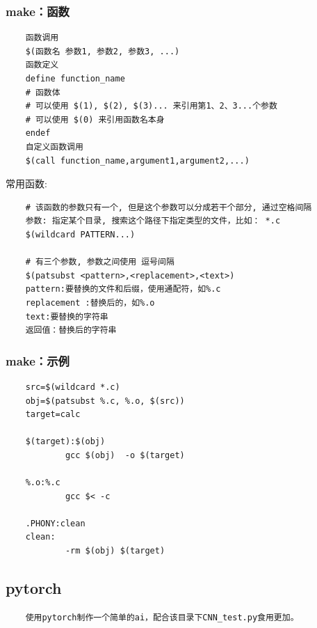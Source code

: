 \documentclass[UTF8]{ctexart}
\begin{document}
\subsubsection{make：函数}
\begin{verbatim}
	函数调用
	$(函数名 参数1, 参数2, 参数3, ...)
	函数定义
	define function_name
	# 函数体
	# 可以使用 $(1), $(2), $(3)... 来引用第1、2、3...个参数
	# 可以使用 $(0) 来引用函数名本身
	endef
	自定义函数调用
	$(call function_name,argument1,argument2,...)
\end{verbatim}
常用函数:
\begin{verbatim}
	# 该函数的参数只有一个, 但是这个参数可以分成若干个部分, 通过空格间隔
	参数:	指定某个目录, 搜索这个路径下指定类型的文件，比如： *.c
	$(wildcard PATTERN...)

	# 有三个参数, 参数之间使用 逗号间隔
	$(patsubst <pattern>,<replacement>,<text>)
	pattern:要替换的文件和后缀，使用通配符，如%.c
	replacement :替换后的，如%.o
	text:要替换的字符串
	返回值：替换后的字符串
\end{verbatim}


\subsubsection{make：示例}
\begin{lstlisting}
	src=$(wildcard *.c)
	obj=$(patsubst %.c, %.o, $(src))
	target=calc

	$(target):$(obj)
			gcc $(obj)  -o $(target)

	%.o:%.c
			gcc $< -c

	.PHONY:clean
	clean:
        	-rm $(obj) $(target) 		
\end{lstlisting}


\subsection{pytorch}
\begin{verbatim}
	使用pytorch制作一个简单的ai，配合该目录下CNN_test.py食用更加。
\end{verbatim}
\end{document}
